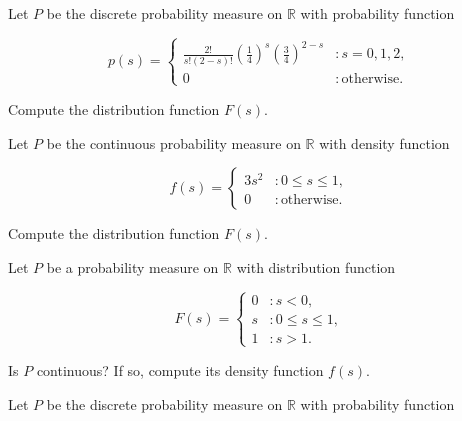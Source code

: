 \documentclass[12pt,reqno]{amsart}
\begin{document}
\newpage
\prob Let $P$ be the discrete probability measure on $\mathbb{R}$ with probability function

	\[
	p(s) = \begin{cases}
	\frac{2!}{s!(2-s)!} \left( \frac{1}{4} \right)^s \left(\frac{3}{4} \right)^{2-s} & : s=0, 1, 2, \\
	0 & :\text{otherwise}.
    	\end{cases}
	\]

Compute the distribution function $F(s)$.\vfill
















\prob Let $P$ be the continuous probability measure on $\mathbb{R}$ with density function

	\[f(s) = \begin{cases}
	3s^2 & : 0 \leq s \leq 1, \\
	0 & : \text{otherwise}.
	\end{cases}
	\]

Compute the distribution function $F(s)$.\vfill
















\prob Let $P$ be a probability measure on $\mathbb{R}$ with distribution function

	\[
	F(s) = \begin{cases}
	0 & : s < 0, \\
	s & : 0\leq s \leq 1, \\
	1 & : s>1.
	\end{cases}
	\]

Is $P$ continuous? If so, compute its density function $f(s)$.\vfill


















\newpage
\prob Let $P$ be the discrete probability measure on $\mathbb{R}$ with probability function
\end{document}
